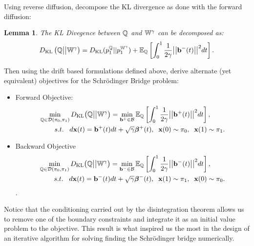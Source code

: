\documentclass[a4paper,12pt,twoside,openright]{report}
\newtheorem{lemma}{Lemma}
\theoremstyle{definition}
\begin{document}
Using reverse diffusion, \cite{pavon1991free} decompose the KL divergence as done with the forward diffusion:
\begin{lemma}\label{lemma:control}\citep{pavon1991free}
    The KL Divegence between ${\mathbb{Q}}$ and $\mathbb{W}^{\gamma}$ can be decomposed as:
\begin{align}\label{eq:free_energy_2}
     D_{\mathrm{KL}}\left({\mathbb{Q}} \big|\big| \mathbb{W}^{\gamma}\right) = D_{\mathrm{KL}}(p^{{\mathbb{Q}}}_1 || p_1^{ \mathbb{W}^{\gamma}}) + \mathbb{E}_{\mathbb{Q}}\left[\int_0^1\frac{1}{2\gamma} \big|\big|{\mathbf{b}}^{-}(t)\big|\big|^2 dt\right].
\end{align}
\end{lemma}
Then using the drift based formulations defined above, \cite{pavon1991free} derive alternate (yet equivalent) objectives for the Schrödinger Bridge problem:

\begin{itemize}
\item Forward Objective: 
\begin{align} \label{eq:controlled_bridge_forward}
    \min_{{\mathbb{Q}} \in {\mathcal{D}}(\pi_0, \pi_1)} D_{\mathrm{KL}}\big({\mathbb{Q}} \big|\big| \mathbb{W}^{\gamma}\big)& = \min_{{\mathbf{b}}^{+} \in {\mathcal{B}} }  \mathbb{E}_{\mathbb{Q}}\left[\int_0^1 \frac{1}{2\gamma}\big|\big|{\mathbf{b}}^{+}(t) \big|\big|^2 dt\right], \nonumber \\
    s.t.\;\;\; d{\mathbf{x}}(t) = {\mathbf{b}}^{+}(t) &dt + \sqrt{\gamma} {\bm{\beta}}^{+}(t), \;\; {\mathbf{x}}(0) \sim \pi_0, \;\; {\mathbf{x}}(1) \sim \pi_1.
\end{align}
\item Backward Objective
\begin{align} \label{eq:controlled_bridge_backward}
    \min_{{\mathbb{Q}} \in {\mathcal{D}}(\pi_0, \pi_1)} D_{\mathrm{KL}}\big({\mathbb{Q}} \big|\big| \mathbb{W}^{\gamma}\big)& = \min_{{\mathbf{b}}^{-} \in {\mathcal{B}} }  \mathbb{E}_{\mathbb{Q}}\left[\int_0^1 \frac{1}{2\gamma}\big|\big|{\mathbf{b}}^{-}(t) \big|\big|^2 dt\right], \nonumber \\
    s.t.\;\;\; d{\mathbf{x}}(t) = {\mathbf{b}}^{-}(t) &dt + \sqrt{\gamma} {\bm{\beta}}^{-}(t), \;\; {\mathbf{x}}(1) \sim \pi_1 , \;\; {\mathbf{x}}(0) \sim \pi_0.
\end{align}.
\end{itemize}
Notice that the conditioning carried out by the disintegration theorem allows us to remove one of the boundary constraints and integrate it as an initial value problem to the objective. This result is what inspired us the most in the design of an iterative algorithm for solving finding the Schrödinger bridge numerically. 
\end{document}
